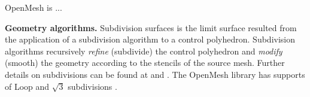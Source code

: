 

OpenMesh \cite{Botsch:2002:OPENMESH} is ...

\noindent \textbf{Geometry algorithms.}
Subdivision surfaces \cite{cc,ds,loop,sqrt3,qts}
is the limit surface resulted from the
application of a subdivision algorithm to a control polyhedron.
Subdivision algorithms recursively \emph{refine} (subdivide) the
control polyhedron and \emph{modify} (smooth) the geometry according
to the stencils of the source mesh.  
Further details on subdivisions can be found at \cite{Sub:course:2000}
and \cite{Warren:subdivision}. The OpenMesh library has
supports of Loop and $\sqrt{3}$ subdivisions \cite{Abhijit:2004:APISUB}.
